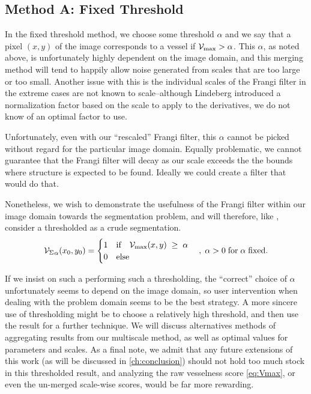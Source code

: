 \subsection{Method A: Fixed Threshold}

In the fixed threshold method, we choose some threshold $\alpha$ and we say that a pixel $(x,y)$ of the image corresponds to a vessel if
$\mathcal{V}_{\max} >  \alpha$. This $\alpha$, as noted above, is unfortunately highly dependent on the image domain, and this merging method will tend to happily allow noise generated from scales that are too large or too small.
 Another issue with this is the individual scales of the Frangi filter in the extreme cases are not known to scale--although Lindeberg introduced a normalization factor based on the scale to apply to the derivatives, we do not know of an optimal factor to use.

Unfortunately, even with our ``rescaled'' Frangi filter, this $\alpha$ cannot be picked without regard for the particular image domain. Equally problematic, we cannot guarantee that the Frangi filter will decay as our scale exceeds the the bounds where structure is expected to be found. Ideally we could create a filter that would do that.

 Nonetheless, we wish to demonstrate the usefulness of the Frangi filter within our image domain towards the segmentation problem, and will therefore, like \cite{huynh2013filter}, consider a thresholded \Vmax{} as a crude segmentation. 
\begin{equation}
{\ensuremath{\mathcal{V}_{\Sigma}}}_{\alpha}(x_0,y_0) = \begin{cases}
1 & \textrm{if}\quad \mathcal{V}_{\max}(x,y) \; \ge\;  \alpha \\
0 & \textrm{else}
\end{cases}  \quad , \; \alpha > 0
\; \textrm{for}\;\alpha\;\textrm{fixed}.
\end{equation}

If we insist on such a performing such a thresholding, the ``correct'' choice of $\alpha$ unfortunately seems to depend on the image domain, so user intervention when dealing with the problem domain seems to be the best strategy. A more sincere use of thresholding might be to choose a relatively high threshold, and then use the result for a further technique.
We will discuss alternatives methods of aggregating results from our multiscale method, as well as optimal values for parameters and scales. As a final note, we admit that any future extensions of this work (as will be discussed in \cref{ch:conclusion}) should not hold too much stock in this thresholded result, and analyzing the 
raw vesselness score \cref{eq:Vmax}, or even the un-merged scale-wise scores, would be far more rewarding.   
 
